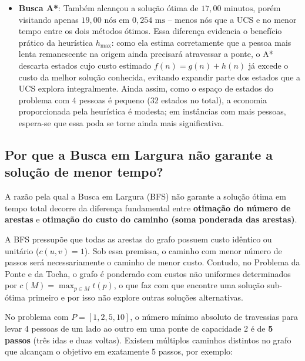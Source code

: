 \begin{itemize}[leftmargin=1.5cm]
	\item \textbf{Busca A*}: Também alcançou a solução ótima de
	      $17{,}00\text{ minutos}$, porém visitando apenas $19{,}00\text{ nós}$ em
	      $0{,}254\text{ ms}$ -- menos nós que a UCS e no menor tempo entre os dois métodos
	      ótimos. Essa diferença evidencia o benefício prático da heurística $h_{\max}$: como
	      ela estima corretamente que a pessoa mais lenta remanescente na origem ainda
	      precisará atravessar a ponte, o A* descarta estados cujo custo estimado
	      $f(n) = g(n) + h(n)$ já excede o custo da melhor solução conhecida, evitando expandir
	      parte dos estados que a UCS explora integralmente. Ainda assim, como o espaço de
	      estados do problema com 4 pessoas é pequeno (32 estados no total), a economia
	      proporcionada pela heurística é modesta; em instâncias com mais pessoas, espera-se
	      que essa poda se torne ainda mais significativa.
\end{itemize}

\subsection{Por que a Busca em Largura não garante a solução de menor tempo?}
\label{subsec:por-que-bfs-nao-garante-otimo}

A razão pela qual a Busca em Largura (BFS) não garante a solução ótima em tempo total
decorre da diferença fundamental entre \textbf{otimação do número de arestas} e
\textbf{otimação do custo do caminho (soma ponderada das arestas)}.

A BFS pressupõe que todas as arestas do grafo possuem custo idêntico ou unitário
($c(u, v) = 1$). Sob essa premissa, o caminho com menor número de passos será
necessariamente o caminho de menor custo. Contudo, no Problema da Ponte e da Tocha, o
grafo é ponderado com custos não uniformes determinados por $c(M) = \max_{p \in M} t(p)$,
o que faz com que encontre uma solução sub-ótima primeiro e por isso não explore outras
soluções alternativas.

No problema com $P = [1, 2, 5, 10]$, o número mínimo absoluto de travessias para levar 4 pessoas de um lado ao outro em uma ponte de capacidade 2 é de \textbf{5 passos} (três idas e duas voltas). Existem múltiplos caminhos distintos no grafo que alcançam o objetivo em exatamente 5 passos, por exemplo:

